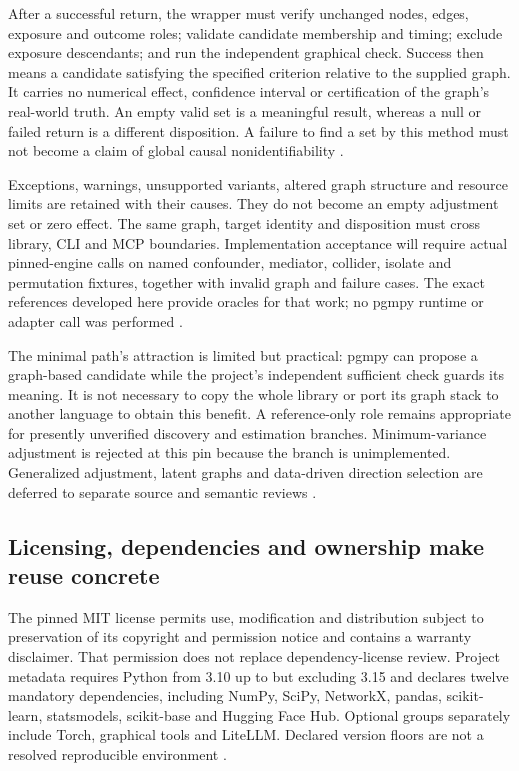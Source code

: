 After a successful return, the wrapper must verify unchanged nodes, edges,
exposure and outcome roles; validate candidate membership and timing;
exclude exposure descendants; and run the independent graphical check.
Success then means a candidate satisfying the specified criterion relative
to the supplied graph. It carries no numerical effect, confidence interval
or certification of the graph's real-world truth. An empty valid set is
a meaningful result, whereas a null or failed return is a different
disposition. A failure to find a set by this method must not become a
claim of global causal nonidentifiability
\cite{exec13_pgmpy_reuse_oracle}.

Exceptions, warnings, unsupported variants, altered graph structure and
resource limits are retained with their causes. They do not become an
empty adjustment set or zero effect. The same graph, target identity and
disposition must cross library, CLI and MCP boundaries. Implementation
acceptance will require actual pinned-engine calls on named confounder,
mediator, collider, isolate and permutation fixtures, together with invalid
graph and failure cases. The exact references developed here provide
oracles for that work; no pgmpy runtime or adapter call was performed
\cite{exec13_pgmpy_reuse_oracle}.

The minimal path's attraction is limited but practical: pgmpy can propose
a graph-based candidate while the project's independent sufficient check
guards its meaning. It is not necessary to copy the whole library or
port its graph stack to another language to obtain this benefit. A
reference-only role remains appropriate for presently unverified discovery
and estimation branches. Minimum-variance adjustment is rejected at this
pin because the branch is unimplemented. Generalized adjustment, latent
graphs and data-driven direction selection are deferred to separate
source and semantic reviews \cite{exec13_pgmpy_reuse_primary}.

\subsection{Licensing, dependencies and ownership make reuse concrete}

The pinned MIT license permits use, modification and distribution subject
to preservation of its copyright and permission notice and contains a
warranty disclaimer. That permission does not replace dependency-license
review. Project metadata requires Python from 3.10 up to but excluding
3.15 and declares twelve mandatory dependencies, including NumPy,
SciPy, NetworkX, pandas, scikit-learn, statsmodels, scikit-base and
Hugging Face Hub. Optional groups separately include Torch, graphical
tools and LiteLLM. Declared version floors are not a resolved reproducible
environment \cite{exec13_pgmpy_reuse_primary}.

